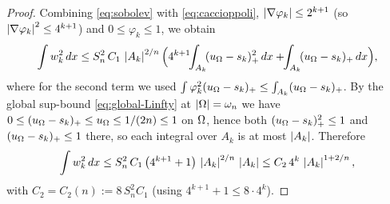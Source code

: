 \begin{proof}
Combining \eqref{eq:sobolev} with \eqref{eq:caccioppoli},
$\left|\nabla\varphi_k\right|\le2^{k+1}$ (so $\left|\nabla\varphi_k\right|^2\le4^{k+1}$)
and $0\le\varphi_k\le1$, we obtain
\begin{equation}\label{eq:after-sobolev}
   \int w_k^2\,dx
   \le S_n^2\,C_1\,\left|A_k\right|^{2/n}
   \Bigl(4^{k+1}\!\!\int_{A_k}\!(u_\Omega-s_k)_+^2\,dx
        +\!\!\int_{A_k}\!(u_\Omega-s_k)_+\,dx\Bigr),
\end{equation}
where for the second term we used
$\int\varphi_k^2(u_\Omega-s_k)_+\le\int_{A_k}(u_\Omega-s_k)_+$.
By the global
sup-bound \eqref{eq:global-Linfty} at $\left|\Omega\right|=\omega_n$ we have
$0\le(u_\Omega-s_k)_+\le u_\Omega\le1/(2n)\le1$ on $\Omega$, hence both
$(u_\Omega-s_k)_+^2\le1$ and $(u_\Omega-s_k)_+\le1$ there, so each integral over
$A_k$ is at most $\left|A_k\right|$. Therefore
\begin{equation}\label{eq:after-sobolev2}
   \int w_k^2\,dx
   \le S_n^2\,C_1\,\bigl(4^{k+1}+1\bigr)\,\left|A_k\right|^{2/n}\,\left|A_k\right|
   \le C_2\,4^{k}\,\left|A_k\right|^{1+2/n},
\end{equation}
with $C_2=C_2(n):=8\,S_n^2 C_1$ (using $4^{k+1}+1\le8\cdot4^{k}$).


\end{proof}
